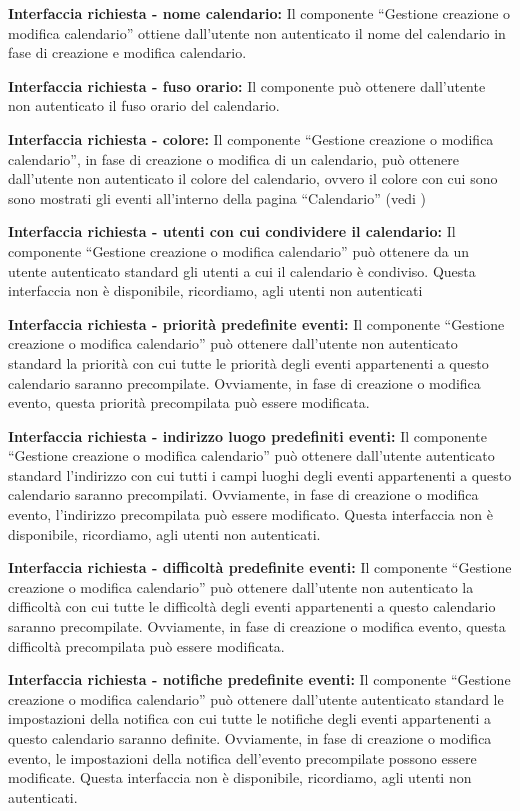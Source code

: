 \begin{listaPersonale}[DCI]{}
    \textbf{Interfaccia richiesta - nome calendario:} Il componente “Gestione creazione o modifica calendario” ottiene dall'utente non autenticato il nome del calendario in fase di creazione e modifica calendario.

    \textbf{Interfaccia richiesta - fuso orario:} Il componente può ottenere dall'utente non autenticato il fuso orario del calendario.

    \textbf{Interfaccia richiesta - colore:} Il componente “Gestione creazione o modifica calendario”, in fase di creazione o modifica di un calendario, può ottenere dall'utente non autenticato il colore del calendario, ovvero il colore con cui sono sono mostrati gli eventi all'interno della pagina “Calendario” (vedi )

    \textbf{Interfaccia richiesta - utenti con cui condividere il calendario:} Il componente “Gestione creazione o modifica calendario” può ottenere da un utente autenticato standard gli utenti a cui il calendario è condiviso. Questa interfaccia non è disponibile, ricordiamo, agli utenti non autenticati

    \textbf{Interfaccia richiesta - priorità predefinite eventi:} Il componente “Gestione creazione o modifica calendario” può ottenere dall'utente non autenticato standard la priorità con cui tutte le priorità degli eventi appartenenti a questo calendario saranno precompilate. Ovviamente, in fase di creazione o modifica evento, questa priorità precompilata può essere modificata.

    \textbf{Interfaccia richiesta - indirizzo luogo predefiniti eventi:} Il componente “Gestione creazione o modifica calendario” può ottenere dall'utente autenticato standard l'indirizzo con cui tutti i campi luoghi degli eventi appartenenti a questo calendario saranno precompilati. Ovviamente, in fase di creazione o modifica evento, l'indirizzo precompilata può essere modificato. Questa interfaccia non è disponibile, ricordiamo, agli utenti non autenticati.

    \textbf{Interfaccia richiesta - difficoltà predefinite eventi:} Il componente “Gestione creazione o modifica calendario” può ottenere dall'utente non autenticato la difficoltà con cui tutte le difficoltà degli eventi appartenenti a questo calendario saranno precompilate. Ovviamente, in fase di creazione o modifica evento, questa difficoltà precompilata può essere modificata.

    \textbf{Interfaccia richiesta - notifiche predefinite eventi:} Il componente “Gestione creazione o modifica calendario” può ottenere dall'utente autenticato standard le impostazioni della notifica con cui tutte le notifiche degli eventi appartenenti a questo calendario saranno definite. Ovviamente, in fase di creazione o modifica evento, le impostazioni della notifica dell'evento precompilate possono essere modificate. Questa interfaccia non è disponibile, ricordiamo, agli utenti non autenticati.


\end{listaPersonale}
